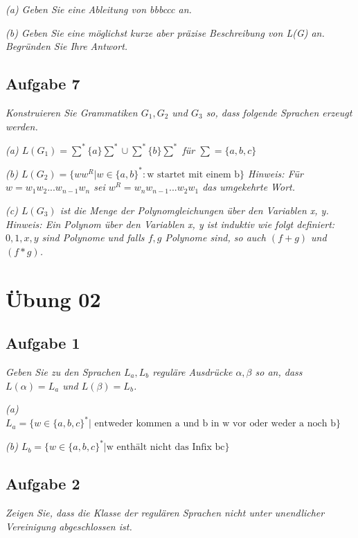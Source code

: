 \documentclass[a4paper]{article}
\begin{document}
\textit{(a) Geben Sie eine Ableitung von bbbccc an.}

\textit{(b) Geben Sie eine möglichst kurze aber präzise Beschreibung von L(G) an. Begründen Sie Ihre Antwort.}

\subsection{Aufgabe 7}
\textit{Konstruieren Sie Grammatiken $G_1, G_2$ und $G_3$ so, dass folgende Sprachen erzeugt werden.}

\textit{(a) $L(G_1)=\sum^*\{a\}\sum^*\cup\sum^*\{b\}\sum^*$ für $\sum=\{a,b,c\}$}

\textit{(b) $L(G_2 ) = \{ww^R \vert w \in \{a, b\}^*: \text{w startet mit einem b}\}$ Hinweis:
Für $w=w_1w_2...w_{n-1}w_n$ sei $w^{R} = w_{n} w_{n-1} ... w_{2} w_{1}$ das umgekehrte Wort.}

\textit{(c) $L(G_3)$ ist die Menge der Polynomgleichungen über den Variablen x, y.
    Hinweis: Ein Polynom über den Variablen x, y ist induktiv wie folgt definiert: $0, 1, x, y$ sind Polynome und falls $f,g$ Polynome sind, so auch $(f+g)$ und $(f*g)$.}

\newpage
\section{Übung 02}
\subsection{Aufgabe 1}
\textit{Geben Sie zu den Sprachen $L_a,L_b$ reguläre Ausdrücke $\alpha,\beta$ so an, dass $L(\alpha) = L_a$ und $L(\beta) = L_b$.}

\textit{(a) $L_a = \{w\in\{a, b, c\}^*\vert\text{ entweder kommen a und b in w vor oder weder a noch b}\}$}

\textit{(b) $L_b = \{w\in\{a, b, c\}^*\vert\text{w enthält nicht das Infix bc}\}$}

\subsection{Aufgabe 2}
\textit{Zeigen Sie, dass die Klasse der regulären Sprachen nicht unter unendlicher Vereinigung abgeschlossen ist.}
\end{document}
